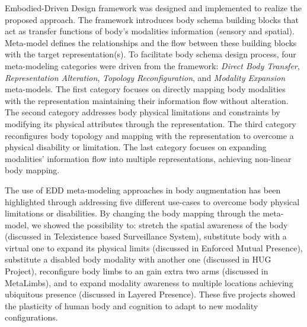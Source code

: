 {Embodied-Driven Design framework was designed and implemented to realize the proposed approach. The framework introduces body schema building blocks that act as transfer functions of body's modalities information (sensory and spatial). Meta-model defines the relationships and the flow between these building blocks with the target representation(s). To facilitate body schema design process, four meta-modeling categories were driven from the framework: \textit{Direct Body Transfer}, \textit{Representation Alteration}, \textit{Topology Reconfiguration}, and \textit{Modality Expansion} meta-models. The first category focuses on directly mapping body modalities with the representation maintaining their information flow without alteration. The second category addresses body physical limitations and constraints by modifying its physical attributes through the representation. The third category reconfigures body topology and mapping with the representation to overcome a physical disability or limitation. The last category focuses on expanding modalities' information flow into multiple representations, achieving non-linear body mapping. 

The use of EDD meta-modeling approaches in body augmentation has been highlighted through addressing five different use-cases to overcome body physical limitations or disabilities. By changing the body mapping through the meta-model, we showed the possibility to: stretch the spatial awareness of the body (discussed in Telexistence based Surveillance System), substitute body with a virtual one to expand its physical limits (discussed in Enforced Mutual Presence), substitute a disabled body modality with another one (discussed in HUG Project), reconfigure body limbs to an gain extra two arms (discussed in MetaLimbs), and to expand modality awareness to multiple locations achieving ubiquitous presence (discussed in Layered Presence). These five projects showed the plasticity of human body and cognition to adapt to new modality configurations.


}
